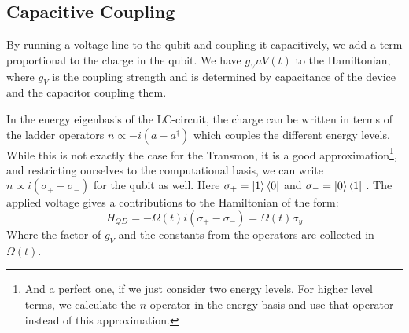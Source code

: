 \subsection{Capacitive Coupling}
By running a voltage line to the qubit and coupling it capacitively, we add a term proportional to the charge in the qubit. We have $g_V n V(t)$ to the Hamiltonian, where $g_V$ is the coupling strength and is determined by capacitance of the device and the capacitor coupling them.

In the energy eigenbasis of the LC-circuit, the charge can be written in terms of the ladder operators $n \propto -i(a - a^\dagger)$ which couples the different energy levels. While this is not exactly the case for the Transmon, it is a good approximation\footnote{And a perfect one, if we just consider two energy levels. For higher level terms, we calculate the $n$ operator in the energy basis and use that operator instead of this approximation.}, and restricting ourselves to the computational basis, we can write $n \propto i(\sigma_+ - \sigma_-)$ for the qubit as well. Here $\sigma_+ = \ket{1}\bra{0}$ and $\sigma_- = \ket{0}\bra{1}$ \cite{krantz_quantum_2019}. The applied voltage gives a contributions to the Hamiltonian of the form:
\begin{equation}
    H_{QD} = - \Omega(t) i \left(\sigma_+ - \sigma_- \right) = \Omega(t) \sigma_y
\end{equation}
Where the factor of $g_V$ and the constants from the operators are collected in  $\Omega(t)$.



